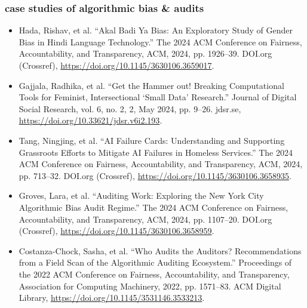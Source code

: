 \documentclass[11pt]{article}
\begin{document}
\subsubsection{case studies of algorithmic bias \& audits}
\label{sec:org780eecf}
\begin{itemize}
\item Hada, Rishav, et al. “Akal Badi Ya Bias: An Exploratory Study of
Gender Bias in Hindi Language Technology.” The 2024 ACM Conference
on Fairness, Accountability, and Transparency, ACM, 2024, pp.
1926–39. DOI.org (Crossref),
\url{https://doi.org/10.1145/3630106.3659017}.
\item Gajjala, Radhika, et al. “Get the Hammer out! Breaking Computational
Tools for Feminist, Intersectional ‘Small Data’ Research.” Journal
of Digital Social Research, vol. 6, no. 2, 2, May 2024, pp. 9–26.
jdsr.se, \url{https://doi.org/10.33621/jdsr.v6i2.193}.
\item Tang, Ningjing, et al. “AI Failure Cards: Understanding and
Supporting Grassroots Efforts to Mitigate AI Failures in Homeless
Services.” The 2024 ACM Conference on Fairness, Accountability, and
Transparency, ACM, 2024, pp. 713–32. DOI.org (Crossref),
\url{https://doi.org/10.1145/3630106.3658935}.
\item Groves, Lara, et al. “Auditing Work: Exploring the New York City
Algorithmic Bias Audit Regime.” The 2024 ACM Conference on Fairness,
Accountability, and Transparency, ACM, 2024, pp. 1107–20. DOI.org
(Crossref), \url{https://doi.org/10.1145/3630106.3658959}.
\item Costanza-Chock, Sasha, et al. “Who Audits the Auditors?
Recommendations from a Field Scan of the Algorithmic Auditing
Ecosystem.” Proceedings of the 2022 ACM Conference on Fairness,
Accountability, and Transparency, Association for Computing
Machinery, 2022, pp. 1571–83. ACM Digital Library,
\url{https://doi.org/10.1145/3531146.3533213}.
\end{itemize}
\end{document}
